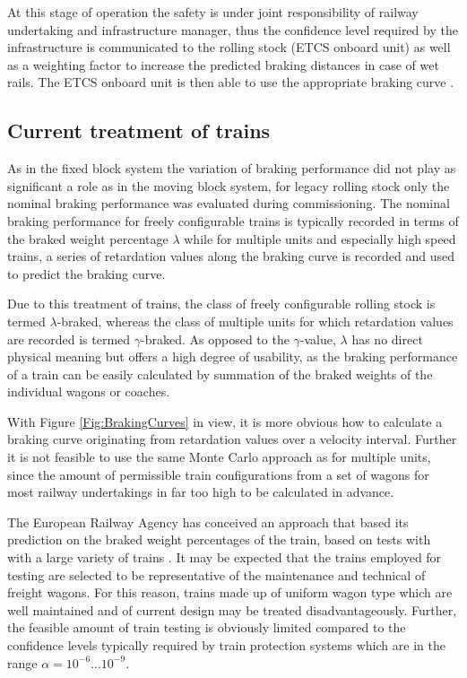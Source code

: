 \documentclass[a4paper, 12pt]{scrartcl}
\begin{document}
At this stage of operation the safety is under joint responsibility of railway undertaking and infrastructure manager, thus the confidence level required by the infrastructure is communicated to the rolling stock (ETCS onboard unit) as well as a weighting factor to increase the predicted braking distances in case of wet rails. The ETCS onboard unit is then able to use the appropriate braking curve \cite{ERAbrakingcurves}.

\subsection{Current treatment of trains}
As in the fixed block system the variation of braking performance did not play as significant a role as in the moving block system, for legacy rolling stock only the nominal braking performance was evaluated during commissioning. The nominal braking performance for freely configurable trains is typically recorded in terms of the braked weight percentage $\lambda$ \cite{uic544-1} while for multiple units and especially high speed trains, a series of retardation values along the braking curve is recorded and used to predict the braking curve.

Due to this treatment of trains, the class of freely configurable rolling stock is termed $\lambda$-braked, whereas the class of multiple units for which retardation values are recorded is termed $\gamma$-braked. As opposed to the $\gamma$-value, $\lambda$ has no direct physical meaning but offers a high degree of usability, as the braking performance of a train can be easily calculated by summation of the braked weights of the individual wagons or coaches.

With Figure \ref{Fig:BrakingCurves} in view, it is more obvious how to calculate a braking curve originating from retardation values over a velocity interval. Further it is not feasible to use the same Monte Carlo approach as for multiple units, since the amount of permissible train configurations from a set of wagons for most railway undertakings in far too high to be calculated in advance.

The European Railway Agency has conceived an approach that based its prediction on the braked weight percentages of the train, based on tests with with a large variety of trains \cite{ERAbrakingcurves}. It may be expected that the trains employed for testing are selected to be representative of the maintenance and technical of freight wagons. For this reason, trains made up of uniform wagon type which are well maintained and of current design may be treated disadvantageously. Further, the feasible amount of train testing is obviously limited compared to the confidence levels typically required by train protection systems which are in the range $\alpha = 10^{-6} \ldots 10^{-9}$.
\end{document}
